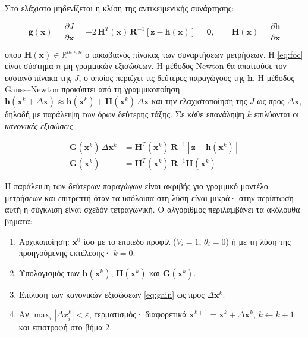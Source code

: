 Στο ελάχιστο μηδενίζεται η κλίση της αντικειμενικής συνάρτησης:

\begin{equation}
\mathbf{g}(\mathbf{x}) = \frac{\partial J}{\partial \mathbf{x}}
  = -2\,\mathbf{H}^{T}(\mathbf{x})\,\mathbf{R}^{-1}\left[\mathbf{z} - \mathbf{h}(\mathbf{x})\right]
  = \mathbf{0}, \qquad
\mathbf{H}(\mathbf{x}) = \frac{\partial \mathbf{h}}{\partial \mathbf{x}}
\label{eq:foc}
\end{equation}

όπου $\mathbf{H}(\mathbf{x}) \in \mathbb{R}^{m \times n}$ ο ιακωβιανός πίνακας των συναρτήσεων
μετρήσεων. Η \eqref{eq:foc} είναι σύστημα $n$ μη γραμμικών εξισώσεων. Η μέθοδος Newton θα
απαιτούσε τον εσσιανό πίνακα της $J$, ο οποίος περιέχει τις δεύτερες παραγώγους της
$\mathbf{h}$. Η μέθοδος Gauss--Newton προκύπτει από τη γραμμικοποίηση
$\mathbf{h}(\mathbf{x}^{k} + \Delta\mathbf{x}) \approx \mathbf{h}(\mathbf{x}^{k}) +
\mathbf{H}(\mathbf{x}^{k})\,\Delta\mathbf{x}$ και την ελαχιστοποίηση της $J$ ως προς
$\Delta\mathbf{x}$, δηλαδή με παράλειψη των όρων δεύτερης τάξης. Σε κάθε επανάληψη $k$
επιλύονται οι \emph{κανονικές εξισώσεις}

\begin{align}
\mathbf{G}(\mathbf{x}^{k}) \, \Delta \mathbf{x}^{k}
  &= \mathbf{H}^{T}(\mathbf{x}^{k}) \, \mathbf{R}^{-1}
     \left[\mathbf{z} - \mathbf{h}(\mathbf{x}^{k})\right] \\
\mathbf{G}(\mathbf{x}^{k})
  &= \mathbf{H}^{T}(\mathbf{x}^{k}) \, \mathbf{R}^{-1} \mathbf{H}(\mathbf{x}^{k})
\label{eq:gain}
\end{align}

Η παράλειψη των δεύτερων παραγώγων είναι ακριβής για γραμμικό μοντέλο μετρήσεων και
επιτρεπτή όταν τα υπόλοιπα στη λύση είναι μικρά· στην περίπτωση αυτή η σύγκλιση είναι σχεδόν
τετραγωνική. Ο αλγόριθμος περιλαμβάνει τα ακόλουθα βήματα:

\begin{enumerate}
\item Αρχικοποίηση: $\mathbf{x}^{0}$ ίσο με το επίπεδο προφίλ ($V_i = 1$, $\theta_i = 0$) ή
      με τη λύση της προηγούμενης εκτέλεσης· $k = 0$.
\item Υπολογισμός των $\mathbf{h}(\mathbf{x}^{k})$, $\mathbf{H}(\mathbf{x}^{k})$ και
      $\mathbf{G}(\mathbf{x}^{k})$.
\item Επίλυση των κανονικών εξισώσεων \eqref{eq:gain} ως προς $\Delta\mathbf{x}^{k}$.
\item Αν $\max_i |\Delta x_i^{k}| < \varepsilon$, τερματισμός· διαφορετικά
      $\mathbf{x}^{k+1} = \mathbf{x}^{k} + \Delta\mathbf{x}^{k}$, $k \leftarrow k + 1$ και
      επιστροφή στο βήμα 2.
\end{enumerate}

